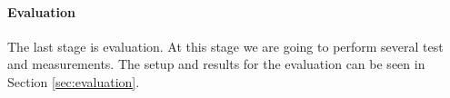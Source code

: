 
\paragraph{Evaluation} The last stage is evaluation. At this stage we are going to perform several test and measurements. The setup and results for the evaluation can be seen in Section \ref{sec:evaluation}. 


